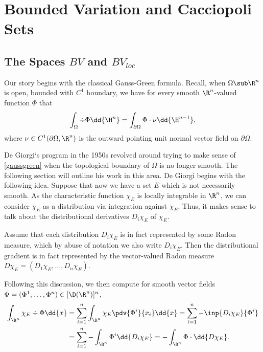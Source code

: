 \documentclass[../main.tex]{subfiles}
\begin{document}
\section{Bounded Variation and Cacciopoli Sets}\label{sec:bv}

\subsection{The Spaces $ BV $ and $ BV_{loc} $}


\begin{figure}[H]

\end{figure}

Our story begins with the classical Gauss-Green formula. Recall, when $ \Omega\sub \R^{n} $ is open, bounded with $ C^{1} $ boundary, we have for every smooth $ \R^{n} $-valued function $ \Phi $ that
\begin{equation}\label{gaussgreen}
    \int_{\Omega} \div{\Phi} \dd{\H^{n}} = \int_{\partial \Omega} \Phi\cdot \nu \dd{\H^{n-1}},
\end{equation}
where $ \nu\in C^{1}(\partial \Omega, \R^{n})  $ is the outward pointing unit normal vector field on $ \partial \Omega $.



De Giorgi`s program in the 1950s revolved around trying to make sense of \eqref{gaussgreen} when the topological boundary of $ \Omega $ is no longer smooth. The following section will outline his work in this area. De Giorgi begins with the following idea. Suppose that now we have a set $ E $ which is not necessarily smooth. As the characteristic function $ \chi_{E} $ is locally integrable in $ \R^{n} $, we can consider $ \chi_{E} $ as a distribution via integration against $ \chi_{E} $. Thus, it makes sense to talk about the distributional derivatives $ D_{i}\chi_{E} $ of $ \chi_{E} $. 

Assume that each distribution $ D_{i} \chi_{E} $ is in fact represented by some Radon measure, which by abuse of notation we also write $ D_{i} \chi_{E} $. Then the distributional gradient is in fact represented by the vector-valued Radon measure $ D\chi_{E} = (D_{1} \chi_{E}, \ldots, D_{n}\chi_{E}) $.

Following this discussion, we then compute for smooth vector fields $ \Phi = ( \Phi^{1}, \ldots, \Phi^{n})\in [\D(\R^{n})]^{n} $,
\begin{align*}
    \int_{\R^{n}} \chi_{E}\div{\Phi} \dd{x} &= \sum_{i=1}^{n}\int_{\R^{n}} \chi_{E} \pdv{\Phi^{i}}{x_{i}} \dd{x} = \sum_{i=1}^{n} -\inp{D_{i} \chi_{E}}{\Phi^{i}} \\
    &= \sum_{i=1}^{n} -\int_{\R^{n}} \Phi^{i} \dd{D_{i} \chi_{E}}= - \int_{\R^{n}} \Phi\cdot \dd{D \chi_{E}}.
\end{align*}
\end{document}
